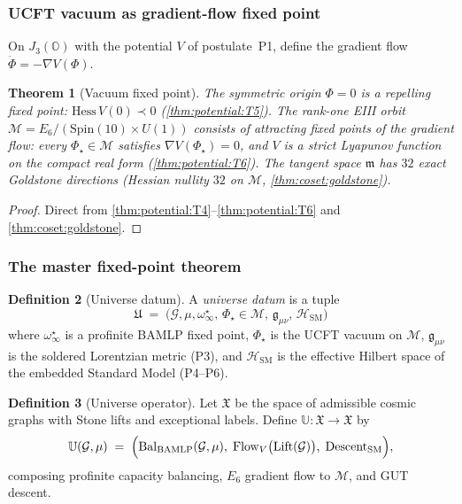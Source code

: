 \documentclass[11pt]{article}
\theoremstyle{plain}
\newtheorem{theorem}{Theorem}[section]
\theoremstyle{definition}
\newtheorem{definition}[theorem]{Definition}
\theoremstyle{remark}
\begin{document}
\subsubsection{UCFT vacuum as gradient-flow fixed point}

On $J_3(\mathbb{O})$ with the potential $V$ of postulate~\textnormal{P1}, define
the gradient flow $\dot\Phi=-\nabla V(\Phi)$.

\begin{theorem}[Vacuum fixed point]\label{thm:bamlp:vacuum-fp}
The symmetric origin $\Phi=0$ is a repelling fixed point: $\mathrm{Hess}\,V(0)
\prec0$ (\autoref{thm:potential:T5}). The rank-one EIII orbit
$\mathcal{M}=E_6/(\mathrm{Spin}(10)\times U(1))$ consists of attracting fixed
points of the gradient flow: every $\Phi_\star\in\mathcal{M}$ satisfies
$\nabla V(\Phi_\star)=0$, and $V$ is a strict Lyapunov function on the compact
real form (\autoref{thm:potential:T6}). The tangent space $\mathfrak{m}$ has
$32$ exact Goldstone directions (Hessian nullity $32$ on $\mathcal{M}$,
\autoref{thm:coset:goldstone}).
\end{theorem}

\begin{proof}
Direct from \autoref{thm:potential:T4}--\autoref{thm:potential:T6} and
\autoref{thm:coset:goldstone}.
\end{proof}

\subsubsection{The master fixed-point theorem}

\begin{definition}[Universe datum]\label{def:bamlp:universe}
A \emph{universe datum} is a tuple
\begin{equation}
  \mathfrak{U}\;=\;\bigl(\mathcal{G},\mu,\omega^\star_\infty,\,
  \Phi_\star\in\mathcal{M},\,\mathfrak{g}_{\mu\nu},\,\mathcal{H}_{\mathrm{SM}}
  \bigr)
\end{equation}
where $\omega^\star_\infty$ is a profinite BAMLP fixed point, $\Phi_\star$ is
the UCFT vacuum on $\mathcal{M}$, $\mathfrak{g}_{\mu\nu}$ is the soldered
Lorentzian metric (P3), and $\mathcal{H}_{\mathrm{SM}}$ is the effective
Hilbert space of the embedded Standard Model (P4--P6).
\end{definition}

\begin{definition}[Universe operator]\label{def:bamlp:Uop}
Let $\mathfrak{X}$ be the space of admissible cosmic graphs with Stone lifts
and exceptional labels. Define $\mathbb{U}:\mathfrak{X}\to\mathfrak{X}$ by
\begin{equation}
  \mathbb{U}(\mathcal{G},\mu)
  \;=\;\Bigl(\mathrm{Bal}_\mathrm{BAMLP}(\mathcal{G},\mu),\;
  \mathrm{Flow}_V\bigl(\mathrm{Lift}(\mathcal{G})\bigr),\;
  \mathrm{Descent}_{\mathrm{SM}}\Bigr),
  \label{eq:bamlp:Uop}
\end{equation}
composing profinite capacity balancing, $E_6$ gradient flow to $\mathcal{M}$,
and GUT descent.
\end{definition}
\end{document}
